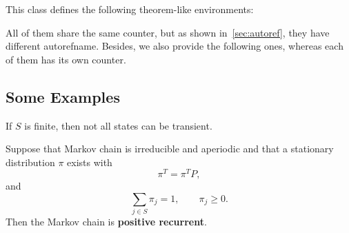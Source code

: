 \documentclass[11pt]{../arxiv}
\begin{document}
This class defines the following theorem-like environments: 
All of them share the same counter, but as shown in~\autoref{sec:autoref}, they have different {\code autorefname}. 
Besides, we also provide the following ones, whereas each of them has its own counter.

\subsection{Some Examples}\label{subsec: theorem-like-env-examples}

\begin{proposition}\label{proposition: not-all-transient}
If $S$ is finite, then not all states can be transient. 
\end{proposition}

\begin{theorem}\label{thm: positive-recurrent}
Suppose that Markov chain is irreducible and aperiodic and that a stationary distribution $\pi$ exists with
\begin{equation}\label{eq: stationary-dist}
\pi^T = \pi^T P,
\end{equation}
and
\begin{equation}\label{eq: sum-to-1}
\sum_{j \in S}\pi_j = 1,\qquad \pi_j \ge 0.
\end{equation}
Then the Markov chain is {\bf positive recurrent}.
\end{theorem}
\end{document}
